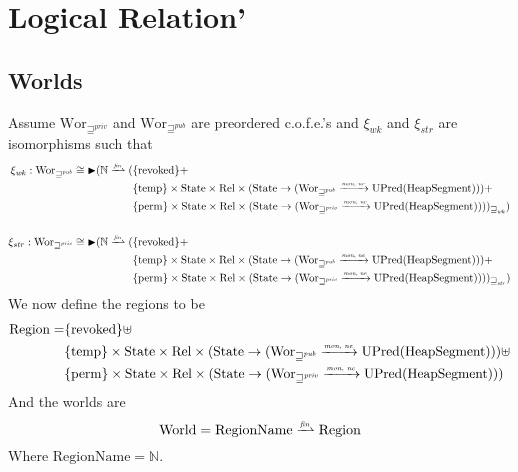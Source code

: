 \documentclass[a4paper]{article}
\newcommand{\finparfun}{\xrightharpoonup{\textit{\tiny{fin}}}}
\newcommand{\monnefun}{\xrightarrow{\textit{\tiny{mon, ne}}}}
\newcommand{\fun}{\rightarrow}
\newcommand{\blater}{\mathop{\blacktriangleright}}
\newcommand{\cofe}{c.o.f.e.}
\newcommand{\cofes}{\cofe{}'s}
\newcommand{\var}[1]{\mathit{#1}}
\newcommand{\future}{\mathbin{\sqsupseteq}}
\newcommand{\futurewk}{\mathbin{\sqsupseteq}^{\var{pub}}}
\newcommand{\futurestr}{\mathbin{\sqsupseteq}^{\var{priv}}}
\newcommand{\plaindom}[1]{\mathrm{#1}}
\newcommand{\HeapSegments}{\plaindom{HeapSegment}}
\newcommand{\nats}{\mathbb{N}}
\newcommand{\Rel}{\plaindom{Rel}}
\newcommand{\States}{\plaindom{State}}
\newcommand{\RegionNames}{\plaindom{RegionName}}
\newcommand{\Regions}{\plaindom{Region}}
\newcommand{\Worlds}{\plaindom{World}}
\newcommand{\Wor}{\plaindom{Wor}}
\newcommand{\Worwk}{\Wor_{\futurewk}}
\newcommand{\Worstr}{\Wor_{\futurestr}}
\newcommand{\UPred}[1]{\plaindom{UPred}(#1)}
\newcommand{\plainview}[1]{\mathrm{#1}}
\newcommand{\perma}{\plainview{perm}}
\newcommand{\temp}{\plainview{temp}}
\newcommand{\revoked}{\plainview{revoked}}
\begin{document}
\section{Logical Relation'}
\subsection{Worlds}
Assume $\Worstr$ and $\Worwk$ are preordered \cofes{} and $\xi_{\var{wk}}$ and $\xi_{\var{str}}$ are isomorphisms such that
\begin{align*}
  \xi_{\var{wk}} :   \Worwk \cong \blater (\nats \finparfun (   & \{\revoked\} + \\
                                                                & \{\temp\} \times \States \times \Rel \times (\States \fun (\Worwk \monnefun \UPred{\HeapSegments})) + \\
                                                                & \{\perma\} \times \States \times \Rel \times (\States \fun (\Worstr \monnefun \UPred{\HeapSegments})))_{\future_{\var{wk}}}) \\ \\
  \xi_{\var{str}} :   \Worstr \cong \blater (\nats \finparfun ( & \{\revoked\} + \\
                                                                & \{\temp\} \times \States \times \Rel \times (\States \fun (\Worwk \monnefun \UPred{\HeapSegments})) + \\
                                                                & \{\perma\} \times \States \times \Rel \times (\States \fun (\Worstr \monnefun \UPred{\HeapSegments})))_{\future_{\var{str}}})
\end{align*}
We now define the regions to be
\begin{align*}
  \Regions = & \{\revoked\} \uplus \\
             & \{\temp\} \times \States \times \Rel \times (\States \fun (\Worwk \monnefun \UPred{\HeapSegments})) \uplus \\
             & \{\perma\} \times \States \times \Rel \times (\States \fun (\Worstr \monnefun \UPred{\HeapSegments}))
\end{align*}
And the worlds are
\[
  \Worlds = \RegionNames \finparfun \Regions
\]
Where $\RegionNames = \nats$.
\end{document}
